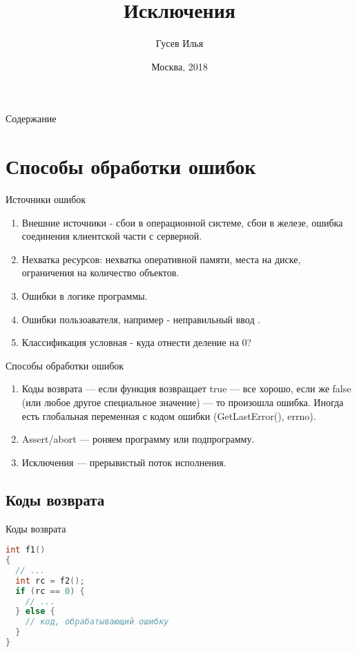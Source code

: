 \documentclass[10pt]{beamer}
\title[\href{https://goo.gl/NRgp8K}{https://goo.gl/NRgp8K} (Term 3)]{Исключения}
\author[Гусев Илья]{Гусев Илья}
\institute[МФТИ] 
{Московский физико-технический институт\\*}
\date{Москва, 2018}
\begin{document}
\begin{frame}
  \titlepage
\end{frame}

\begin{frame}{Содержание}
\tableofcontents
\end{frame}

\section{Способы обработки ошибок}
\begin{frame}[fragile]{Источники ошибок}
\begin{enumerate}
    \item Внешние источники - сбои в операционной системе, сбои в железе, ошибка соединения клиентской части с серверной.
    \item Нехватка ресурсов: нехватка оперативной памяти, места на диске, ограничения на количество объектов.
    \item Ошибки в логике программы.
    \item Ошибки пользоавателя, например - неправильный ввод .
    \item Классификация условная - куда отнести деление на 0?
\end{enumerate}
\end{frame}

\begin{frame}[fragile]{Способы обработки ошибок}
\begin{enumerate}
    \item Коды возврата — если функция возвращает true — все хорошо, если же false (или любое другое специальное значение) — то произошла ошибка. Иногда есть глобальная переменная с кодом ошибки (GetLastError(), errno).
    \item Assert/abort — роняем программу или подпрограмму.
    \item Исключения — прерывистый поток исполнения.
\end{enumerate}
\end{frame}

\subsection{Коды возврата}
\begin{frame}[fragile]{Коды возврата}
\begin{lstlisting}[language=C++]
int f1()
{
  // ...
  int rc = f2();
  if (rc == 0) {
    // ...
  } else {
    // код, обрабатывающий ошибку
  }
}
\end{lstlisting}
\end{frame}
\end{document}
